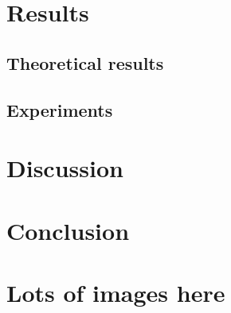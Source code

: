\documentclass{kththesis}
\begin{document}
\chapter{Results}
\section{Theoretical results}
\section{Experiments}

\chapter{Discussion}

\chapter{Conclusion}


\printbibliography[heading=bibintoc] %

\appendix

\chapter{Lots of images here}
\end{document}

